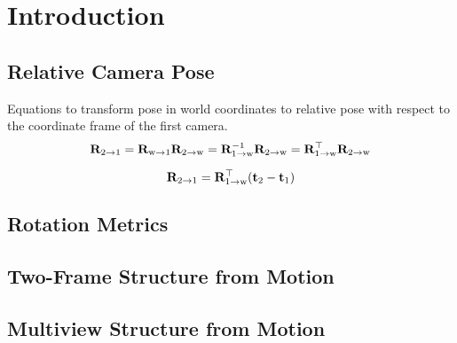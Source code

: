 \chapter{Introduction}

	\section{Relative Camera Pose}
		Equations to transform pose in world coordinates to relative pose with respect to the coordinate frame of the first camera.
		\begin{equation}
			\mathbf{R}_{2 \rightarrow 1} 	= \mathbf{R}_{\text{w} \rightarrow 1} \mathbf{R}_{2 \rightarrow \text{w}}
										= \mathbf{R}_{1 \rightarrow \text{w}}^{-1} \mathbf{R}_{2 \rightarrow \text{w}}
										= \mathbf{R}_{1 \rightarrow \text{w}}^{\top} \mathbf{R}_{2 \rightarrow \text{w}}
		\end{equation}
		
		\begin{equation}
			\mathbf{R}_{2 \rightarrow 1} = \mathbf{R}_{1 \rightarrow \text{w}}^{\top} (\mathbf{t}_2 - \mathbf{t}_1)
		\end{equation}


	\section{Rotation Metrics}
	\cite{huynh2009metrics}
	
	\section{Two-Frame Structure from Motion}
	
	\section{Multiview Structure from Motion}
	
